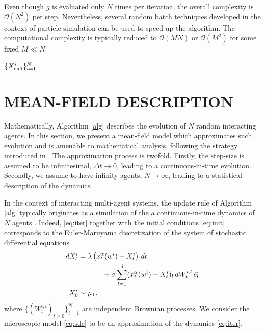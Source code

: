 \documentclass[letterpaper, 10 pt, conference]{ieeeconf}  %
\begin{document}
Even though $g$ is evaluated only $N$ times per iteration, the overall complexity is $\mathcal{O}(N^2)$ per step. Nevertheless, several random batch techniques developed in the context of particle simulation \cite{AlPa, JLJ} can be used to speed-up the algorithm. The computational complexity is typically reduced to $\mathcal{O}(MN)$ or $\mathcal{O}(M^2)$ for some fixed $M \ll N$. 

\begin{algorithm}%
\caption{M-CBO} 
\label{alg}
\begin{algorithmic}
	\ENDFOR
\ENDWHILE
{}
\RETURN $\{ X_{\textup{end}}^i \}_{i=1}^N$
\end{algorithmic}
\end{algorithm}


%
\section{MEAN-FIELD DESCRIPTION}
\label{s:4}

Mathematically, Algorithm \ref{alg} describes the evolution of $N$ random interacting agents. In this section, we present a mean-field model which approximates such evolution and is amenable to mathematical analysis, following the strategy introduced in \cite{pinnau2017consensus}. The approximation process is twofold. Firstly, the step-size is assumed to be infinitesimal, $\Delta t\to 0$, leading to a continuous-in-time evolution. Secondly, we assume to have infinity agents, $N \to \infty$, leading to a statistical description of the dynamics.

In the context of interacting multi-agent systems, the update rule of Algorithm \ref{alg} typically originates as a simulation of the a continuous-in-time dynamics of $N$ agents \cite{pareschi13}. %
Indeed, \eqref{eq:iter} together with the initial conditions \eqref{eq:init} corresponds to the Euler-Maruyama discretization of the system of stochastic differential equations
\begin{equation}
\begin{split}
dX^i_t &= \lambda \left(x_t^\alpha(w^i) - X^i_t\right)\,dt \\
&\hspace{1.2cm}+  \sigma \sum_{l=1}^d ( x_t^\alpha(w^i) - X^i_t)_l \,dW_{t}^{i,l}\, \vec{e_l}\\
X_0^i &\sim \rho_0 \,,
\end{split}
\label{eq:sde}
\end{equation} 
where $\{(W_t^{i,l})_{t\geq0} \}_{i=1}^N$ are independent Brownian processes. We consider the microscopic model \eqref{eq:sde} to be an approximation of the dynamics \eqref{eq:iter}. 
\end{document}
